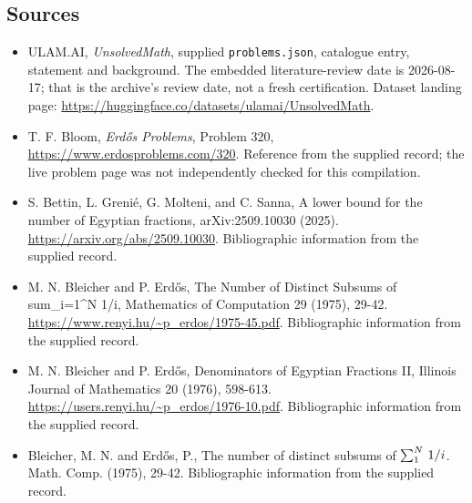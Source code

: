 \documentclass[11pt,a4paper]{article}
\begin{document}
\subsection{Sources}

{\small

\begin{itemize}

\item[\hypertarget{source:statement:1}{S1}] ULAM.AI, \emph{UnsolvedMath}, supplied \texttt{problems.json}, catalogue entry, statement and background. The embedded literature-review date is 2026-08-17; that is the archive’s review date, not a fresh certification. Dataset landing page: \url{https://huggingface.co/datasets/ulamai/UnsolvedMath}.

\item[\hypertarget{source:statement:2}{S2}] T. F. Bloom, \emph{Erdős Problems}, Problem 320, \url{https://www.erdosproblems.com/320}. Reference from the supplied record; the live problem page was not independently checked for this compilation.

\item[\hypertarget{source:statement:3}{S3}] S. Bettin, L. Grenié, G. Molteni, and C. Sanna, A lower bound for the number of Egyptian fractions, arXiv:2509.10030 (2025). \url{https://arxiv.org/abs/2509.10030}. Bibliographic information from the supplied record.

\item[\hypertarget{source:statement:4}{S4}] M. N. Bleicher and P. Erdős, The Number of Distinct Subsums of sum\_{i=1}\textasciicircum{}N 1/i, Mathematics of Computation 29 (1975), 29-42. \url{https://www.renyi.hu/~p_erdos/1975-45.pdf}. Bibliographic information from the supplied record.

\item[\hypertarget{source:statement:5}{S5}] M. N. Bleicher and P. Erdős, Denominators of Egyptian Fractions II, Illinois Journal of Mathematics 20 (1976), 598-613. \url{https://users.renyi.hu/~p_erdos/1976-10.pdf}. Bibliographic information from the supplied record.

\item[\hypertarget{source:statement:6}{S6}] Bleicher, M. N. and Erd\H{o}s, P., The number of distinct subsums of $\sum \sb{1}^{N}\,1/i$. Math. Comp. (1975), 29-42. Bibliographic information from the supplied record.

\end{itemize}

}

\label{end:statement}
\end{document}
